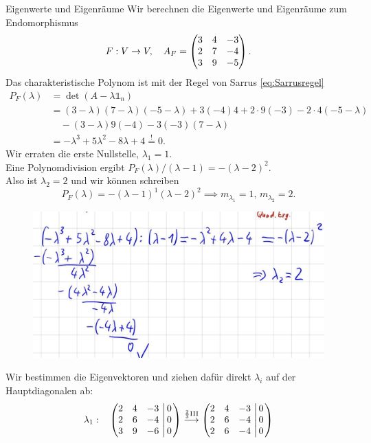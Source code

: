 \begin{Beispiel}{Eigenwerte und Eigenräume}
Wir berechnen die Eigenwerte und Eigenräume zum Endomorphismus
\begin{equation*}
F: V\to V,\quad A_F=\begin{pmatrix}3&4&-3\\2&7&-4\\3&9&-5\end{pmatrix}.
\end{equation*}
Das charakteristische Polynom ist mit der Regel von Sarrus \eqref{eq:Sarrusregel}
\begin{align*}
P_F(\lambda)&=\det(A-\lambda\mathds{1}_n)\\
&=(3-\lambda)(7-\lambda)(-5-\lambda)+3(-4)4+2\cdot 9(-3)-2\cdot 4(-5-\lambda)\\
&\quad-(3-\lambda)9(-4)-3(-3)(7-\lambda)\\
&=-\lambda^3+5\lambda^2-8\lambda+4\overset{!}{=}0.
\end{align*}
Wir erraten die erste Nullstelle, $\lambda_1=1$.\\
Eine Polynomdivision ergibt $P_F(\lambda)/(\lambda-1)=-(\lambda-2)^2$.\\
Also ist $\lambda_2=2$ und wir können schreiben
\begin{equation*}
P_F(\lambda)=-(\lambda-1)^1(\lambda-2)^2\implies m_{\lambda_1}=1,\,m_{\lambda_2}=2.
\end{equation*}
\begin{figure}
 \vspace{-15pt}
\includegraphics[width=.35\textwidth]{Dateien/01/01PolDiv.jpg}
 \vspace{-15pt}
\end{figure}
Wir bestimmen die Eigenvektoren und ziehen dafür direkt $\lambda_i$ auf der Hauptdiagonalen ab:
\begin{align*}
\lambda_1:\quad &\MatrixInvertieren{2&4&-3\\2&6&-4\\3&9&-6}{0\\0\\0}\overset{\frac{2}{3}\tx{III}}{\longrightarrow}\MatrixInvertieren{2&4&-3\\2&6&-4\\2&6&-4}{0\\0\\0}\\

\end{align*}
\end{Beispiel}
